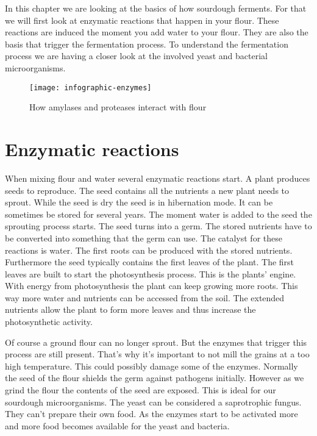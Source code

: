 In this chapter we are looking at the basics of how sourdough ferments.
For that we will first look at enzymatic reactions
that happen in your flour. These reactions are induced
the moment you add water to your flour. They are also
the basis that trigger the fermentation process. To understand
the fermentation process we are having a closer look at the involved
yeast and bacterial microorganisms.

\begin{figure}[!htb]
  \texttt{[image: infographic-enzymes]}
  \caption{How amylases and proteases interact with flour}
  \label{infographic-enzymes}
\end{figure}

\section{Enzymatic reactions}

When mixing flour and water several enzymatic reactions
start. A plant produces seeds to reproduce. The seed
contains all the nutrients a new plant needs to sprout.
While the seed is dry the seed is in hibernation mode. It
can be sometimes be stored for several years. The moment water is added
to the seed the sprouting process starts. The seed turns
into a germ. The stored nutrients have to be converted
into something that the germ can use. The catalyst for these
reactions is water. The first roots can be produced with the stored nutrients.
Furthermore the seed typically contains the first leaves
of the plant. The first leaves are built to start the photosynthesis
process. This is the plants' engine. With energy from photosynthesis
the plant can keep growing more roots. This way more water
and nutrients can be accessed from the soil. The extended 
nutrients allow the plant to form more leaves and thus
increase the photosynthetic activity.

Of course a ground flour can no longer sprout. But the enzymes
that trigger this process are still present. That's why it's
important to not mill the grains at a too high temperature.
This could possibly damage some of the enzymes. Normally
the seed of the flour shields the germ against pathogens initially.
However as we grind the flour the contents of the seed
are exposed. This is ideal for our sourdough microorganisms.
The yeast can be considered a saprotrophic fungus.
They can't prepare their own food. As the enzymes start
to be activated more and more food becomes available
for the yeast and bacteria.

